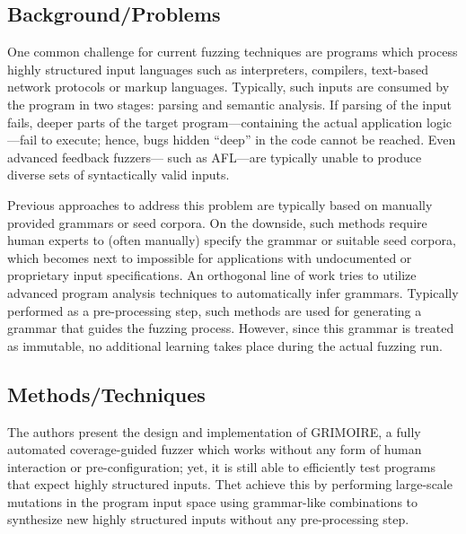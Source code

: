 \subsection{Background/Problems}
One common challenge for current fuzzing techniques are programs which process highly structured input languages such as interpreters, compilers, text-based network protocols or markup languages. Typically, such inputs are consumed by the program in two stages: parsing and semantic analysis. If parsing of the input fails, deeper parts of the target program—containing the actual application logic—fail to execute; hence, bugs hidden “deep” in the code cannot be reached. Even advanced feedback fuzzers— such as AFL—are typically unable to produce diverse sets of syntactically valid inputs.

Previous approaches to address this problem are typically based on manually provided grammars or seed corpora. On the downside, such methods require human experts to (often manually) specify the grammar or suitable seed corpora, which becomes next to impossible for applications with undocumented or proprietary input specifications. An orthogonal line of work tries to utilize advanced program analysis techniques to automatically infer grammars. Typically performed as a pre-processing step, such methods are used for generating a grammar that guides the fuzzing process. However, since this grammar is treated as immutable, no additional learning takes place during the actual fuzzing run.

\subsection{Methods/Techniques}
The authors present the design and implementation of GRIMOIRE, a fully automated coverage-guided fuzzer which works without any form of human interaction or pre-configuration; yet, it is still able to efficiently test programs that expect highly structured inputs. Thet achieve this by performing large-scale mutations in the program input space using grammar-like combinations to synthesize new highly structured inputs without any pre-processing step. 

